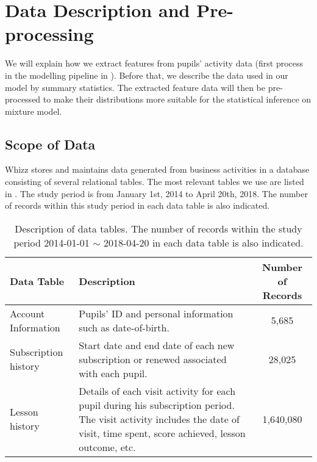 \section{Data Description and Pre-processing}
\label{sec:data}

We will explain how we extract features from pupils' activity data (first process in the modelling pipeline in ). Before that, we describe the data used in our model by summary statistics. The extracted feature data will then be pre-processed to make their distributions more suitable for the statistical inference on mixture model. 

\subsection{Scope of Data}
\label{sec:dataScope}

Whizz stores and maintains data generated from business activities in a database consisting of several relational tables. The most relevant tables we use are listed in . The study period is from January 1st, 2014 to April 20th, 2018. The number of records within this study period in each data table is also indicated.

\begin{table}[!h]
\centering
\footnotesize
\begin{tabular}{l|p{7cm}|c}
\hline
\textbf{Data Table} & \textbf{Description} & \textbf{Number of Records} \\
\hline
Account Information &
Pupils' ID and personal information such as date-of-birth. &
5,685 \\
\hline
Subscription history &
Start date and end date of each new subscription or renewed associated with each pupil. &
28,025 \\
\hline
Lesson history &
Details of each visit activity for each pupil during his subscription period. The visit activity includes the date of visit, time spent, score achieved, lesson outcome, etc. &
1,640,080 \\
\hline
\end{tabular}
\caption{Description of data tables. The number of records within the study period 2014-01-01 $\sim$ 2018-04-20 in each data table is also indicated.}
\label{tab:dataTable}
\end{table}

